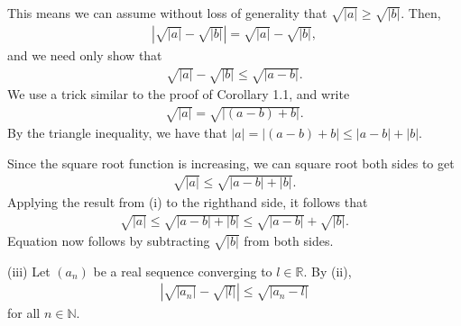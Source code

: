 \documentclass[letterpaper,10pt,english]{jupyterBook}
\begin{document}
\sphinxAtStartPar
This means we can assume without loss of generality that \(\sqrt{|a|}\geq\sqrt{|b|}\). Then,
\begin{equation*}
\begin{split}
\left|\sqrt{|a|} - \sqrt{|b|}\right| = \sqrt{|a|}-\sqrt{|b|},
\end{split}
\end{equation*}
\sphinxAtStartPar
and we need only show that
\begin{equation}\label{equation:Solutions-upto46:eq:sqrta-sqrtb}
\begin{split}\sqrt{|a|} - \sqrt{|b|} \leq \sqrt{|a - b|}.\end{split}
\end{equation}
\sphinxAtStartPar
We use a trick similar to the proof of Corollary 1.1, and write
\begin{equation*}
\begin{split}
\sqrt{|a|} = \sqrt{\big|(a-b) + b\big|}.
\end{split}
\end{equation*}
\sphinxAtStartPar
By the triangle inequality, we have that \(|a| = \big|(a-b) + b\big| \leq |a-b|+|b|\).

\sphinxAtStartPar
Since the square root function is increasing, we can square root both sides to get
\begin{equation*}
\begin{split}
\sqrt{|a|} \leq \sqrt{|a-b|+|b|}.
\end{split}
\end{equation*}
\sphinxAtStartPar
Applying the result from (i) to the right\sphinxhyphen{}hand side, it follows that
\begin{equation*}
\begin{split}
\sqrt{|a|} \leq \sqrt{|a-b|+|b|} \leq \sqrt{|a-b|}+\sqrt{|b|}.
\end{split}
\end{equation*}
\sphinxAtStartPar
Equation {\hyperref[\detokenize{Solutions-upto46:equation-eq-sqrta-sqrtb}]{}} now follows by subtracting \(\sqrt{|b|}\) from both sides.

\sphinxAtStartPar
(iii) Let \((a_n)\) be a real sequence converging to \(l\in\mathbb{R}\). By (ii),
\begin{equation*}
\begin{split}
\left|\sqrt{|a_{n}|}-\sqrt{|l|}\right| \leq \sqrt{\big|a_n-l\big|}
\end{split}
\end{equation*}
\sphinxAtStartPar
for all \(n\in\mathbb{N}\).
\end{document}
